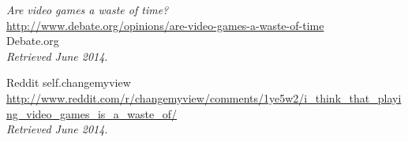 \begin{thebibliography}{99}
  \emph{Are video games a waste of time?} \\
  \url{http://www.debate.org/opinions/are-video-games-a-waste-of-time} \\
  Debate.org \\
  \emph{Retrieved June 2014}.

  Reddit self.changemyview \\
  \url{http://www.reddit.com/r/changemyview/comments/1ye5w2/i_think_that_playing_video_games_is_a_waste_of/} \\
  \emph{Retrieved June 2014}.

\end{thebibliography}
